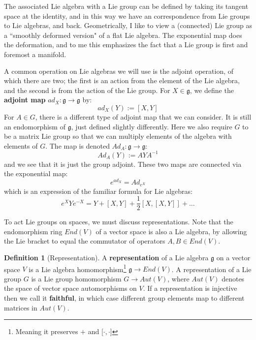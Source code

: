 \documentclass[11pt, oneside]{article}   	%
\theoremstyle{definition}
\newtheorem{definition}{Definition}[section]
\begin{document}
The associated Lie algebra with a Lie group can be defined by taking its tangent space at the 
identity, and in this way we have an correspondence from Lie groups to Lie algebras, and back. 
Geometrically, I like to view a (connected) Lie group as a ``smoothly deformed version" of a flat Lie algebra. 
The exponential map does the deformation, and to me this emphasizes the fact that a Lie group is 
first and foremost a manifold. 

A common operation on Lie algebras we will use is the adjoint operation, of which there are two; the 
first is an action from the element of the Lie algebra, and the second is from the action of the Lie group. 
For $X\in\mathfrak g$, we define the \textbf{adjoint map} $ad_X : \mathfrak g\rightarrow\mathfrak g$ by:
\begin{equation}
	ad_X(Y) := [X, Y]
\end{equation}
For $A\in G$, there is a different type of adjoint map that we can consider. It is still an endomorphism of 
$\mathfrak g$, just defined slightly differently. Here we also require $G$ to be a matrix Lie group so that 
we can multiply elements of the algebra with elements of $G$. The map is denoted $Ad_A : \mathfrak g
\rightarrow\mathfrak g$:
\begin{equation}
	Ad_A(Y) := AYA^{-1}
\end{equation}
and we see that it is just the group adjoint. These two maps are connected via the exponential map:
\begin{equation}
	e^{ad_X} = Ad_{e^{X}}
\end{equation}
which is an expression of the familiar formula for Lie algebras:
\begin{equation}
	e^{X} Y e^{-X} = Y + [X, Y] + \frac{1}{2}[X, [X, Y]] + ...
\end{equation}

To act Lie groups on spaces, we must discuss representations. Note that the endomorphism ring 
$End(V)$ of a vector space is also a Lie algebra, by allowing the Lie bracket to equal the commutator 
of operators $A, B\in End(V)$. 
\begin{definition}[Representation]
	A \textbf{representation} of a Lie algebra $\mathfrak g$ on a vector space $V$ is a Lie 
	algebra homomorphism\footnote{Meaning it preserves $+$ and $[\cdot, \cdot$]}  
	$\mathfrak g\rightarrow End(V)$. A representation of a Lie group $G$ is a Lie group 
	homomorphism $G\rightarrow Aut(V)$, where $Aut(V)$ denotes the space of vector space 
	automorphisms on $V$. If a representation is injective then we call it \textbf{faithful}, in which 
	case different group elements map to different matrices in $Aut(V)$. 
\end{definition}
\end{document}
